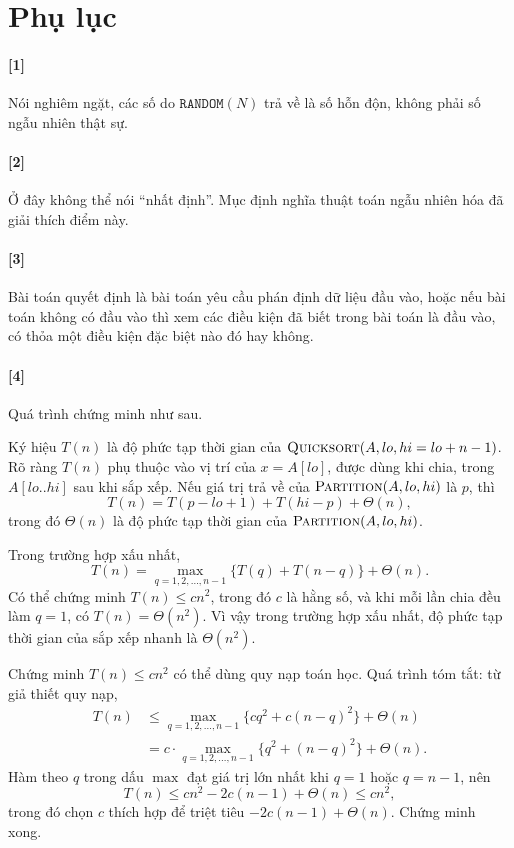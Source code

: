 \documentclass[11pt]{article}
\begin{document}
\section*{Phụ lục}

\paragraph{[1]}
Nói nghiêm ngặt, các số do \(\texttt{RANDOM}(N)\) trả về là số hỗn độn, không
phải số ngẫu nhiên thật sự.

\paragraph{[2]}
Ở đây không thể nói ``nhất định''. Mục định nghĩa thuật toán ngẫu nhiên hóa đã
giải thích điểm này.

\paragraph{[3]}
Bài toán quyết định là bài toán yêu cầu phán định dữ liệu đầu vào, hoặc nếu
bài toán không có đầu vào thì xem các điều kiện đã biết trong bài toán là đầu
vào, có thỏa một điều kiện đặc biệt nào đó hay không.

\paragraph{[4]}
Quá trình chứng minh như sau.

Ký hiệu \(T(n)\) là độ phức tạp thời gian của
\(\textsc{Quicksort}(A,lo,hi=lo+n-1)\). Rõ ràng \(T(n)\) phụ thuộc vào vị trí
của \(x=A[lo]\), được dùng khi chia, trong \(A[lo..hi]\) sau khi sắp xếp. Nếu
giá trị trả về của \(\textsc{Partition}(A,lo,hi)\) là \(p\), thì
\[
  T(n)=T(p-lo+1)+T(hi-p)+\Theta(n),
\]
trong đó \(\Theta(n)\) là độ phức tạp thời gian của
\(\textsc{Partition}(A,lo,hi)\).

Trong trường hợp xấu nhất,
\[
  T(n)=\max_{q=1,2,\ldots,n-1}\{T(q)+T(n-q)\}+\Theta(n).
\]
Có thể chứng minh \(T(n)\le cn^2\), trong đó \(c\) là hằng số, và khi mỗi lần
chia đều làm \(q=1\), có \(T(n)=\Theta(n^2)\). Vì vậy trong trường hợp xấu
nhất, độ phức tạp thời gian của sắp xếp nhanh là \(\Theta(n^2)\).

Chứng minh \(T(n)\le cn^2\) có thể dùng quy nạp toán học. Quá trình tóm tắt:
từ giả thiết quy nạp,
\[
\begin{aligned}
T(n)
&\le \max_{q=1,2,\ldots,n-1}\{cq^2+c(n-q)^2\}+\Theta(n)\\
&= c\cdot \max_{q=1,2,\ldots,n-1}\{q^2+(n-q)^2\}+\Theta(n).
\end{aligned}
\]
Hàm theo \(q\) trong dấu \(\max\) đạt giá trị lớn nhất khi \(q=1\) hoặc
\(q=n-1\), nên
\[
  T(n)\le cn^2-2c(n-1)+\Theta(n)\le cn^2,
\]
trong đó chọn \(c\) thích hợp để triệt tiêu \(-2c(n-1)+\Theta(n)\). Chứng
minh xong.
\end{document}
